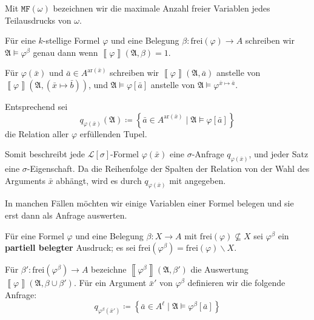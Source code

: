 Mit $\mathtt{MF}\left(\omega\right)$ bezeichnen wir die maximale
Anzahl freier Variablen jedes Teilausdrucks von $\omega$.
\begin{defn}
Für eine $k$-stellige Formel $\varphi$ und eine Belegung $\beta:\mathrm{frei}\left(\varphi\right)\rightarrow A$
schreiben wir $\mathfrak{A}\models\varphi^{\beta}$ genau dann wenn
$\left\llbracket \varphi\right\rrbracket \left(\mathfrak{A},\beta\right)=1$.

Für $\varphi\left(\bar{x}\right)$ und $\bar{a}\in A^{\mathrm{ar}\left(\bar{x}\right)}$
schreiben wir $\left\llbracket \varphi\right\rrbracket \left(\mathfrak{A},\bar{a}\right)$
anstelle von $\left\llbracket \varphi\right\rrbracket \left(\mathfrak{A},\left(\bar{x}\mapsto\bar{b}\right)\right)$,
und $\mathfrak{A}\models\varphi\left[\bar{a}\right]$ anstelle von
$\mathfrak{A}\models\varphi^{\bar{x}\mapsto\bar{a}}$.

Entsprechend sei 
\[
q_{\varphi\left(\bar{x}\right)}\left(\mathfrak{A}\right)\coloneqq\left\{ \bar{a}\in A^{\mathrm{ar}\left(\bar{x}\right)}\mid\mathfrak{A}\models\varphi\left[\bar{a}\right]\right\} 
\]
die Relation aller $\varphi$ erfüllenden Tupel.
\end{defn}
Somit beschreibt jede $\mathcal{L}\left[\sigma\right]$-Formel $\varphi\left(\bar{x}\right)$
eine $\sigma$-Anfrage $q_{\varphi\left(\bar{x}\right)}$, und jeder
Satz eine $\sigma$-Eigenschaft. Da die Reihenfolge der Spalten der
Relation von der Wahl des Arguments $\bar{x}$ abhängt, wird es durch
$q_{\varphi\left(\bar{x}\right)}$ mit angegeben.

In manchen Fällen möchten wir einige Variablen einer Formel belegen
und sie erst dann als Anfrage auswerten.
\begin{defn}
Für eine Formel $\varphi$ und eine Belegung $\beta:X\rightarrow A$
mit $\mathrm{frei}\left(\varphi\right)\nsubseteq X$ sei $\varphi^{\beta}$
ein \textbf{partiell belegter} Ausdruck; es sei $\mathrm{frei}\left(\varphi^{\beta}\right)=\mathrm{frei}\left(\varphi\right)\backslash X$.

Für $\beta':\mathrm{frei}\left(\varphi^{\beta}\right)\rightarrow A$
bezeichne $\left\llbracket \varphi^{\beta}\right\rrbracket \left(\mathfrak{A},\beta'\right)$
die Auswertung $\left\llbracket \varphi\right\rrbracket \left(\mathfrak{A},\beta\cup\beta'\right)$.
Für ein Argument $\bar{x}'$ von $\varphi^{\beta}$ definieren wir
die folgende Anfrage: 
\[
q_{\varphi^{\beta}\left(\bar{x}'\right)}\coloneqq\left\{ \bar{a}\in A^{\ell}\mid\mathfrak{A}\models\varphi^{\beta}\left[\bar{a}\right]\right\} 
\]
\end{defn}

